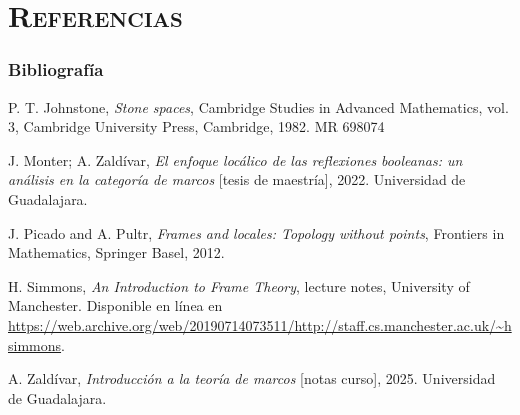\documentclass[compress,12pt]{beamer}
\begin{document}
\section*{\textsc{Referencias}}
\begin{frame}[allowframebreaks]
\frametitle{Bibliografía}
\begin{thebibliography}{20}

 P. T. Johnstone, \textit{Stone spaces}, Cambridge Studies in Advanced Mathematics, vol. 3, Cambridge University Press, Cambridge, 1982. MR 698074

 J. Monter; A. Zaldívar, \textit{El enfoque locálico de las reflexiones booleanas: un análisis en la categoría de marcos} [tesis de maestría], 2022. Universidad de Guadalajara.


 J. Picado and A. Pultr, \textit{Frames and locales: Topology without points}, Frontiers in Mathematics, Springer Basel, 2012.





 H. Simmons, \textit{An Introduction to Frame Theory}, lecture notes, University of Manchester. Disponible en línea en \url{https://web.archive.org/web/20190714073511/http://staff.cs.manchester.ac.uk/~hsimmons}.





 A. Zaldívar, \textit{Introducción a la teoría de marcos} [notas curso], 2025. Universidad de Guadalajara.
\end{thebibliography}
\end{frame}
\end{document}
